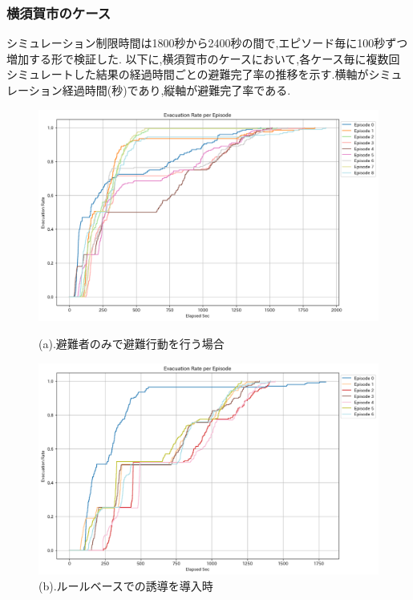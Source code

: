 \subsubsection{横須賀市のケース}
シミュレーション制限時間は1800秒から2400秒の間で,エピソード毎に100秒ずつ増加する形で検証した.
以下に,横須賀市のケースにおいて,各ケース毎に複数回シミュレートした結果の経過時間ごとの避難完了率の推移を示す.横軸がシミュレーション経過時間(秒)であり,縦軸が避難完了率である.
\begin{figure}[H]
  \centering
  \begin{minipage}{0.45\textwidth}
      \centering
      \includegraphics[width=\textwidth]{Figures/Yokosuka-EvaOnly-ERE.png} %
      \caption{(a).避難者のみで避難行動を行う場合}
      \label{fig:graph-a}
  \end{minipage}
  \hfill %
  \begin{minipage}{0.45\textwidth}
      \centering
      \includegraphics[width=\textwidth]{Figures/Yokosuka-RuleModel-ERE.png} %
      \caption{(b).ルールベースでの誘導を導入時}
      \label{fig:graph-b}
  \end{minipage}
  

\end{figure}
